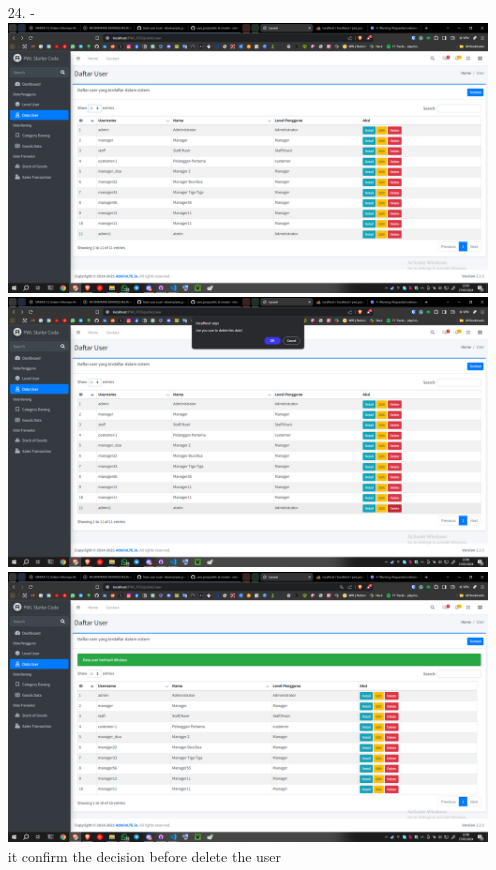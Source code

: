\documentclass[12pt,titlepage]{article}
\begin{document}
\begin{enumerate}
    \item[24.] - \\ \includegraphics[width=.9\textwidth]{images/figures/Screenshot (469).png} \\ \includegraphics[width=.9\textwidth]{images/figures/Screenshot (470).png} \\ \includegraphics[width=.9\textwidth]{images/figures/Screenshot (471).png} \\ it confirm the decision before delete the user
\end{enumerate}
\newpage
\end{document}
